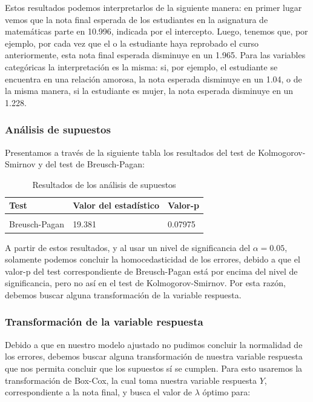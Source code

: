 \documentclass[
]{article}
\begin{document}
Estos resultados podemos interpretarlos de la siguiente manera: en
primer lugar vemos que la nota final esperada de los estudiantes en la
asignatura de matemáticas parte en 10.996, indicada por el intercepto.
Luego, tenemos que, por ejemplo, por cada vez que el o la estudiante
haya reprobado el curso anteriormente, esta nota final esperada
disminuye en un 1.965. Para las variables categóricas la interpretación
es la misma: si, por ejemplo, el estudiante se encuentra en una relación
amorosa, la nota esperada disminuye en un 1.04, o de la misma manera, si
la estudiante es mujer, la nota esperada disminuye en un 1.228.

\hypertarget{anuxe1lisis-de-supuestos}{%
\subsubsection{Análisis de supuestos}\label{anuxe1lisis-de-supuestos}}

Presentamos a través de la siguiente tabla los resultados del test de
Kolmogorov-Smirnov y del test de Breusch-Pagan:

\begin{longtable}[t]{lll}
\caption{\label{tab:resultados test mat}Resultados de los análisis de supuestos}\\
\toprule
Test & Valor del estadístico & Valor-p\\
\midrule
\cellcolor{gray!6}{Kolmogorov-Smirnov} & \cellcolor{gray!6}{0.073843} & \cellcolor{gray!6}{0.02693}\\
Breusch-Pagan & 19.381 & 0.07975\\
\bottomrule
\end{longtable}

A partir de estos resultados, y al usar un nivel de significancia del
\(\alpha = 0.05\), solamente podemos concluir la homocedasticidad de los
errores, debido a que el valor-p del test correspondiente de
Breusch-Pagan está por encima del nivel de significancia, pero no así en
el test de Kolmogorov-Smirnov. Por esta razón, debemos buscar alguna
transformación de la variable respuesta.

\hypertarget{transformaciuxf3n-de-la-variable-respuesta}{%
\subsubsection{Transformación de la variable
respuesta}\label{transformaciuxf3n-de-la-variable-respuesta}}

Debido a que en nuestro modelo ajustado no pudimos concluir la
normalidad de los errores, debemos buscar alguna transformación de
nuestra variable respuesta que nos permita concluir que los supuestos sí
se cumplen. Para esto usaremos la transformación de Box-Cox, la cual
toma nuestra variable respuesta \(Y\), correspondiente a la nota final,
y busca el valor de \(\lambda\) óptimo para:
\end{document}
